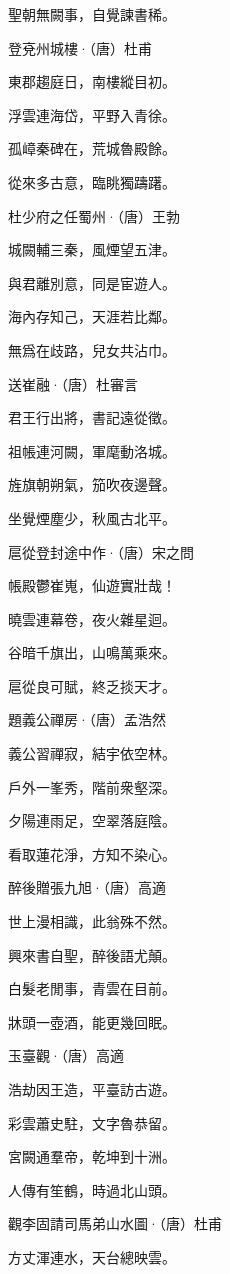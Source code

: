 \documentclass[12pt,a4paper]{ctexbook}
\begin{document}
聖朝無闕事，自覺諫書稀。\par
登兗州城樓·（唐）杜甫\par
東郡趨庭日，南樓縱目初。\par
浮雲連海岱，平野入青徐。\par
孤嶂秦碑在，荒城魯殿餘。\par
從來多古意，臨眺獨躊躇。\par
杜少府之任蜀州·（唐）王勃\par
城闕輔三秦，風煙望五津。\par
與君離別意，同是宦遊人。\par
海內存知己，天涯若比鄰。\par
無爲在歧路，兒女共沾巾。\par
送崔融·（唐）杜審言\par
君王行出將，書記遠從徵。\par
祖帳連河闕，軍麾動洛城。\par
旌旗朝朔氣，笳吹夜邊聲。\par
坐覺煙塵少，秋風古北平。\par
扈從登封途中作·（唐）宋之問\par
帳殿鬱崔嵬，仙遊實壯哉！\par
曉雲連幕卷，夜火雜星迴。\par
谷暗千旗出，山鳴萬乘來。\par
扈從良可賦，終乏掞天才。\par
題義公禪房·（唐）孟浩然\par
義公習禪寂，結宇依空林。\par
戶外一峯秀，階前衆壑深。\par
夕陽連雨足，空翠落庭陰。\par
看取蓮花淨，方知不染心。\par
醉後贈張九旭·（唐）高適\par
世上漫相識，此翁殊不然。\par
興來書自聖，醉後語尤顛。\par
白髮老閒事，青雲在目前。\par
牀頭一壺酒，能更幾回眠。\par
玉臺觀·（唐）高適\par
浩劫因王造，平臺訪古遊。\par
彩雲蕭史駐，文字魯恭留。\par
宮闕通羣帝，乾坤到十洲。\par
人傳有笙鶴，時過北山頭。\par
觀李固請司馬弟山水圖·（唐）杜甫\par
方丈渾連水，天台總映雲。\par
\end{document}
